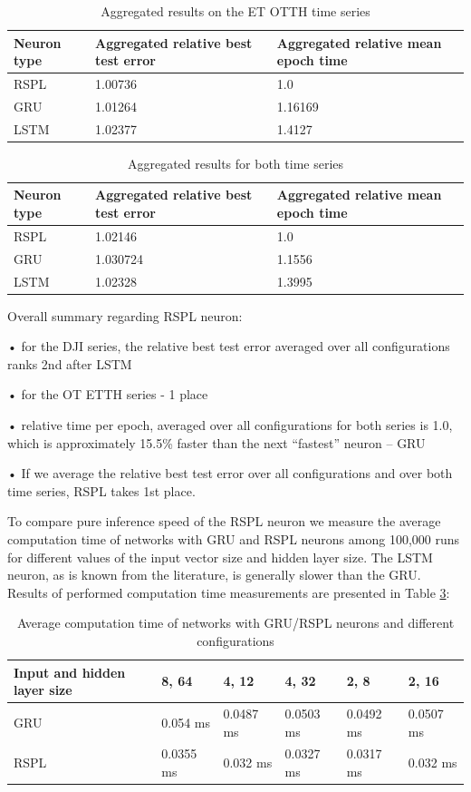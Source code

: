 \documentclass[sn-apa]{sn-jnl}%
\begin{document}
\begin{table}[H]
\caption{Aggregated results on the ET OTTH time series}\label{table4}
\begin{tabular}{ |p{2.2cm}|p{5cm}|p{5cm}|  }
 \hline
  Neuron type & Aggregated relative best test error & Aggregated relative mean epoch time \\
  \hline
 RSPL & 1.00736 & 1.0 \\
 \hline  
 GRU & 1.01264 & 1.16169 \\
 \hline 
 LSTM & 1.02377 & 1.4127 \\
 \hline
\end{tabular}
\end{table}

\begin{table}[H]
\caption{Aggregated results for both time series}\label{table5}
\begin{tabular}{ |p{2.2cm}|p{5cm}|p{5cm}|  }
 \hline
  Neuron type & Aggregated relative best test error & Aggregated relative mean epoch time \\
  \hline
 RSPL & 1.02146 & 1.0 \\
 \hline  
 GRU & 1.030724 & 1.1556 \\
 \hline 
 LSTM & 1.02328 & 1.3995 \\
 \hline
\end{tabular}
\end{table}

Overall summary regarding RSPL neuron: 

• for the DJI series, the relative best test error averaged over all configurations ranks 2nd after LSTM 

• for the OT ETTH series - 1 place 

• relative time per epoch, averaged over all configurations for both series is 1.0, which is approximately 15.5\% faster than the next “fastest” neuron – GRU 

• If we average the relative best test error over all configurations and over both time series, RSPL takes 1st place. 

To compare pure inference speed of the RSPL neuron we measure the average computation time of networks with GRU and RSPL neurons among 100,000 runs for different values of the input vector size and hidden layer size. The LSTM neuron, as is known from the literature, is generally slower than the GRU. Results of performed computation time measurements are presented in Table \ref{table6}:

\begin{table}[H]
\caption{Average computation time of networks with GRU/RSPL neurons and different configurations}\label{table6}
\begin{tabular}{ |p{2cm}|p{2cm}|p{2cm}|p{2cm}|p{2cm}|p{2cm}|  }
 \hline
  Input and hidden layer size & 8, 64 & 4, 12 &  4, 32 & 2, 8 & 2, 16 \\
  \hline
 GRU & 0.054 ms & 0.0487 ms & 0.0503 ms & 0.0492 ms & 0.0507 ms \\
 \hline 
 RSPL & 0.0355 ms & 0.032 ms & 0.0327 ms & 0.0317 ms & 0.032 ms \\
 \hline
\end{tabular}
\end{table}
\end{document}
